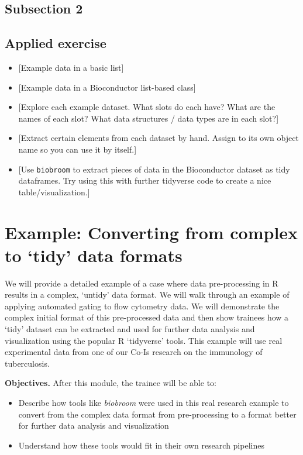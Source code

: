 \documentclass[]{tufte-book}
\providecommand{\tightlist}{%
  \setlength{\itemsep}{0pt}\setlength{\parskip}{0pt}}
\begin{document}
\hypertarget{subsection-2-3}{%
\subsection{Subsection 2}\label{subsection-2-3}}

\hypertarget{applied-exercise-5}{%
\subsection{Applied exercise}\label{applied-exercise-5}}

\begin{itemize}
\tightlist
\item
  {[}Example data in a basic list{]}
\item
  {[}Example data in a Bioconductor list-based class{]}
\item
  {[}Explore each example dataset. What slots do each have? What are the names of each slot?
  What data structures / data types are in each slot?{]}
\item
  {[}Extract certain elements from each dataset by hand. Assign to its own object name so
  you can use it by itself.{]}
\item
  {[}Use \texttt{biobroom} to extract pieces of data in the Bioconductor dataset as tidy dataframes.
  Try using this with further tidyverse code to create a nice table/visualization.{]}
\end{itemize}

\hypertarget{module17}{%
\section{Example: Converting from complex to `tidy' data formats}\label{module17}}

We will provide a detailed example of a case where data pre-processing in R
results in a complex, `untidy' data format. We will walk through an example of
applying automated gating to flow cytometry data. We will demonstrate the
complex initial format of this pre-processed data and then show trainees how a
`tidy' dataset can be extracted and used for further data analysis and
visualization using the popular R `tidyverse' tools. This example will use real
experimental data from one of our Co-Is research on the immunology of
tuberculosis.

\textbf{Objectives.} After this module, the trainee will be able to:

\begin{itemize}
\tightlist
\item
  Describe how tools like \textit{biobroom} were used in this real research
  example to convert from the complex data format from pre-processing to a format
  better for further data analysis and visualization
\item
  Understand how these tools would fit in their own research pipelines
\end{itemize}
\end{document}
